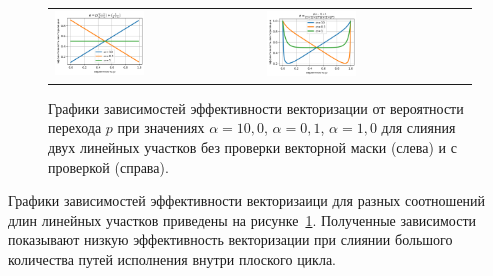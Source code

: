 \documentclass[a4paper,14pt]{extarticle}                     %
\theoremstyle{plain}                                         %
\begin{document}
\begin{figure}[ht]
\centering
\begin{tabular}{ll}
	\includegraphics[width=0.45\textwidth]{./pics/text_4_vec_mrg_under_cond/chart_e_merged.png}
	&
	\includegraphics[width=0.45\textwidth]{./pics/text_4_vec_check_mask/chart_e_merged.png}
\end{tabular}
\singlespacing
{}\caption{Графики зависимостей эффективности векторизации от вероятности перехода $p$ при значениях $\alpha = 10,0$, $\alpha = 0,1$, $\alpha = 1,0$ для слияния двух линейных участков без проверки векторной маски (слева) и с проверкой (справа).}
\label{fig:text_4_vec_under_cond_chart_e_merged}
\end{figure}

Графики зависимостей эффективности векторизаици для разных соотношений длин линейных участков приведены на рисунке~\ref{fig:text_4_vec_under_cond_chart_e_merged}.
Полученные зависимости показывают низкую эффективность векторизации при слиянии большого количества путей исполнения внутри плоского цикла.
\end{document}
